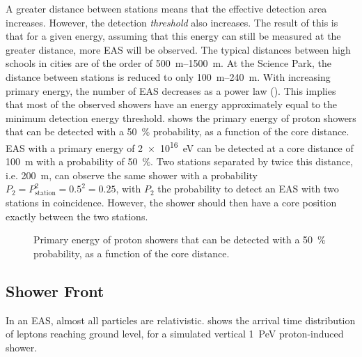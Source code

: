 A greater distance between stations means that the effective detection area
increases.  However, the detection \emph{threshold} also increases.  The
result of this is that for a given energy, assuming that this energy can
still be measured at the greater distance, more EAS will be observed. The
typical distances between high schools in cities are of the order of
\SIrange{500}{1500}{\meter}.  At the Science Park, the distance between stations
is reduced to only \SIrange{100}{240}{\meter}. With increasing primary energy,
the number of EAS decreases as a power law ().  This
implies that most of the observed showers have an energy approximately equal to
the minimum detection energy threshold.  shows
the primary energy of proton showers that can be detected with a
\SI{50}{\percent} probability, as a function of the core distance. EAS with a
primary energy of \SI{2e16}{\electronvolt} can be detected at a core distance of
\SI{100}{\meter} with a probability of \SI{50}{\percent}. Two stations separated
by twice this distance, i.e. \SI{200}{\meter}, can observe the same shower with
a probability $P_2 = P_\mathrm{station}^2 = 0.5^2 = 0.25$, with $P_2$ the
probability to detect an EAS with two stations in coincidence. However, the
shower should then have a core position exactly between the two stations.
\begin{figure}
\centering

\caption{Primary energy of proton showers that can be detected with a
\SI{50}{\percent} probability, as a function of the core distance.}
\label{fig:energy-threshold-vs-R}
\end{figure}


\subsection{Shower Front}

In an EAS, almost all particles are relativistic.
 shows the arrival time distribution of leptons
reaching ground level, for a simulated vertical \SI{1}{\peta\electronvolt}
proton-induced shower.

